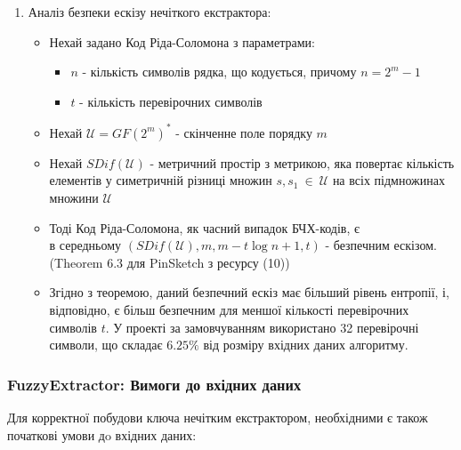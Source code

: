 \documentclass[11pt]{article}
\providecommand{\tightlist}{%
      \setlength{\itemsep}{0pt}\setlength{\parskip}{0pt}}
\begin{document}
    \begin{enumerate}
\def\labelenumi{\arabic{enumi}.}
\setcounter{enumi}{2}
\tightlist
\item
  Аналіз безпеки ескізу нечіткого екстрактора:

  \begin{itemize}
  \tightlist
  \item
    Нехай задано Код Ріда-Соломона з параметрами:

    \begin{itemize}
    \tightlist
    \item
      \(n\) - кількість символів рядка, що кодується, причому
      \(n = 2^m-1\)
    \item
      \(t\) - кількість перевірочних символів
    \end{itemize}
  \item
    Нехай \(\mathscr{U} = GF(2^m)^*\) - скінченне поле порядку \(m\)
  \item
    Нехай \(SDif(\mathscr{U})\) - метричний простір з метрикою, яка
    повертає кількість елементів у симетричній різниці множин
    \(s,s_1~\in~\mathscr{U}\) на всіх підмножинах множини
    \(\mathscr{U}\)
  \item
    Тоді Код Ріда-Соломона, як часний випадок БЧХ-кодів, є\\
    в середньому \((SDif(\mathscr{U}),m,m-t\log{n+1},t)\) - безпечним
    ескізом. (Theorem 6.3 для PinSketch з ресурсу (10))
  \item
    Згідно з теоремою, даний безпечний ескіз має більший рівень
    ентропії, і, відповідно, є більш безпечним для меншої кількості
    перевірочних символів \(t\). У проекті за замовчуванням використано
    32 перевірочні символи, що складає \(6.25\%\) від розміру вхідних
    даних алгоритму.
  \end{itemize}
\end{enumerate}

    \hypertarget{fuzzyextractor-ux432ux438ux43cux43eux433ux438-ux434ux43e-ux432ux445ux456ux434ux43dux438ux445-ux434ux430ux43dux438ux445}{%
\subsubsection{FuzzyExtractor: Вимоги до вхідних
даних}\label{fuzzyextractor-ux432ux438ux43cux43eux433ux438-ux434ux43e-ux432ux445ux456ux434ux43dux438ux445-ux434ux430ux43dux438ux445}}

Для корректної побудови ключа нечітким екстрактором, необхідними є також
початкові умови дo вхідних даних:
\end{document}
